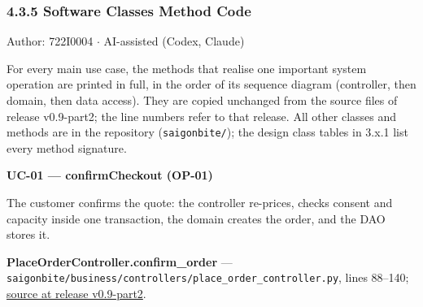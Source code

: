 \subsubsection*{4.3.5 Software Classes Method Code}
Author: 722I0004 \ensuremath{\cdot} AI-assisted (Codex, Claude)

For every main use case, the methods that realise one important system operation are printed in full, in the order of its sequence diagram (controller, then domain, then data access). They are copied unchanged from the source files of release v0.9-part2; the line numbers refer to that release. All other classes and methods are in the repository (\texttt{saigonbite/\allowbreak{}}); the design class tables in 3.x.1 list every method signature.

\textbf{UC-01 --- confirmCheckout (OP-01)}

The customer confirms the quote: the controller re-prices, checks consent and capacity inside one transaction, the domain creates the order, and the DAO stores it.

\textbf{PlaceOrderController.confirm\_order} --- \texttt{saigonbite/\allowbreak{}business/\allowbreak{}controllers/\allowbreak{}place\_\allowbreak{}order\_\allowbreak{}controller.\allowbreak{}py}, lines 88--140; \href{\TargetRepo\detokenize{/blob/v0.9-part2/saigonbite/business/controllers/place_order_controller.py#L88-L140}}{source at release v0.9-part2}.

